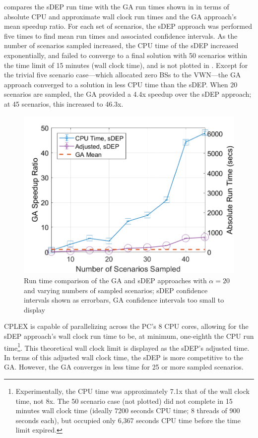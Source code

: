 \documentclass[12pt,dvipsnames]{report}
\begin{document}
 compares the sDEP run time with the GA run times shown in  in terms of absolute CPU and approximate wall clock run times and the GA approach's mean speedup ratio.  For each set of scenarios, the sDEP approach was performed five times to find mean run times and associated confidence intervals.  As the number of scenarios sampled increased, the CPU time of the sDEP increased exponentially, and failed to converge to a final solution with 50 scenarios within the time limit of 15 minutes (wall clock time), and is not plotted in .  Except for the trivial five scenario case---which allocated zero BSs to the VWN---the GA approach converged to a solution in less CPU time than the sDEP.  When 20 scenarios are sampled, the GA provided a 4.4x speedup over the sDEP approach; at 45 scenarios, this increased to 46.3x.

\begin{figure}[ht]
	\centering
	\includegraphics[height=0.45\textheight]{Figures/Prelim_VOSGA_SpeedupRatio_AbsComp_alpha20}
	\caption[Preliminary simulation run time comparison of the GA and sDEP approaches with fixed $\alpha$]{Run time comparison of the GA and sDEP approaches with $\alpha = 20$ and varying numbers of sampled scenarios; sDEP confidence intervals shown as errorbars, GA confidence intervals too small to display}
	\label{fig:Prelim_AlgSpeedupRunTime}
\end{figure}

CPLEX is capable of parallelizing across the PC's 8 CPU cores, allowing for the sDEP approach's wall clock run time to be, at minimum, one-eighth the CPU run time\footnote{Experimentally, the CPU time was approximately 7.1x that of the wall clock time, not 8x.  The 50 scenario case (not plotted) did not complete in 15 minutes wall clock time (ideally 7200 seconds CPU time; 8 threads of 900 seconds each), but occupied only 6,367 seconds CPU time before the time limit expired.}.  This theoretical wall clock limit is displayed as the sDEP's adjusted time.  In terms of this adjusted wall clock time, the sDEP is more competitive to the GA.  However, the GA converges in less time for 25 or more sampled scenarios.
\end{document}
